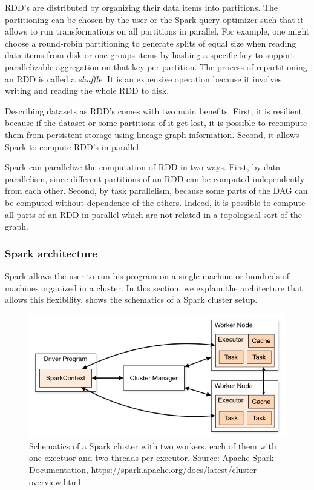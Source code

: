 RDD's are distributed by organizing their data items into partitions.
The partitioning can be chosen by the user or the Spark query optimizer such that it allows to run transformations on all partitions
in parallel.
For example, one might choose a round-robin partitioning to generate splits of equal size when reading data items from disk or one
groups items by hashing a specific key to support parallelizable aggregation on that key per partition.
The process of repartitioning an RDD is called a \textit{shuffle}.
It is an expensive operation because it involves writing and reading the whole RDD to disk.

Describing datasets as RDD's comes with two main benefits.
First, it is resilient because if the dataset or some partitions of it get lost, it is possible to recompute them from persistent storage
using lineage graph information.
Second, it allows Spark to compute RDD's in parallel.

Spark can parallelize the computation of RDD in two ways.
First, by data-parallelism, since different partitions of an RDD can
be computed independently from each other.
Second, by task parallelism, because some parts of the DAG can be computed without dependence of the others.
Indeed, it is possible to compute all parts of an RDD in parallel which are not related in a topological sort of the graph.

\subsubsection{Spark architecture} \label{subsubsec:spark-architecture}
Spark allows the user to run his program on a single machine or hundreds of machines organized in a cluster.
In this section, we explain the architecture that allows this flexibility.
 shows the schematics of a Spark cluster setup.

\begin{figure}
    \includegraphics[width=\textwidth]{figures/spark-cluster.png}
    \caption{
      Schematics of a Spark cluster with two workers, each of them with one exectuor and two threads per executor.
      Source: Apache Spark Documentation, https://spark.apache.org/docs/latest/cluster-overview.html
    }
    \label{fig:spark-cluster}
\end{figure}

